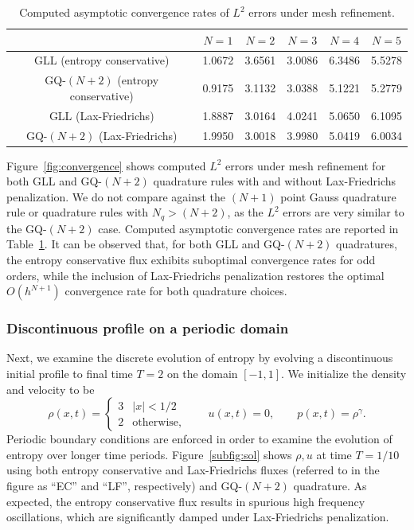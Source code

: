 \documentclass[preprint,10pt]{elsarticle}
\theoremstyle{definition}
\theoremstyle{lemma}
\theoremstyle{theorem}
\theoremstyle{assumption}
\newcommand{\LRb}[1]{\left| #1 \right|}
\begin{document}
\begin{table}[h!]
\centering
 \begin{tabular}{||c | c |c |c |c | c|} 
 \hline
 &  $N=1$ &  $N=2$ &  $N=3$ &  $N=4$ &  $N=5$\\
 \hline
 GLL (entropy conservative) & 1.0672 & 3.6561  &  3.0086 &   6.3486 &   5.5278\\ 
 \hline
 GQ-$(N+2)$ (entropy conservative) &  0.9175  &  3.1132  &  3.0388 &   5.1221 &   5.2779 \\ 
 \hline
 GLL (Lax-Friedrichs) & 1.8887  &  3.0164  &  4.0241 &   5.0650 &   6.1095\\ 
 \hline
 GQ-$(N+2)$ (Lax-Friedrichs) & 1.9950  &  3.0018  &  3.9980  &  5.0419  &  6.0034\\ 
 \hline
 \end{tabular}
 \caption{Computed asymptotic convergence rates of $L^2$ errors under mesh refinement.}
 \label{tab:rates}
\end{table}

Figure~\ref{fig:convergence} shows computed $L^2$ errors under mesh refinement for both GLL and GQ-$(N+2)$ quadrature rules with and without Lax-Friedrichs penalization.  We do not compare against the $(N+1)$ point Gauss quadrature rule or quadrature rules with $N_q > (N+2)$, as the $L^2$ errors are very similar to the GQ-$(N+2)$ case.  Computed asymptotic convergence rates are reported in Table~\ref{tab:rates}.  It can be observed that, for both GLL and GQ-$(N+2)$ quadratures, the entropy conservative flux exhibits suboptimal convergence rates for odd orders, while the inclusion of Lax-Friedrichs penalization restores the optimal $O(h^{N+1})$ convergence rate for both quadrature choices.

\subsubsection{Discontinuous profile on a periodic domain}

Next, we examine the discrete evolution of entropy by evolving a discontinuous initial profile to final time $T=2$ on the domain $[-1,1]$.  We initialize the density and velocity to be 
\begin{equation}
\rho(x,t) = \begin{cases}
3 & \LRb{x} < 1/2\\
2 & \text{otherwise},
\end{cases} \qquad 
u(x,t) = 0, \qquad
p(x,t) = \rho^\gamma.
\label{eq:discontin}
\end{equation}
Periodic boundary conditions are enforced in order to examine the evolution of entropy over longer time periods.  Figure~\ref{subfig:sol} shows $\rho, u$ at time $T = 1/10$ using both entropy conservative and Lax-Friedrichs fluxes (referred to in the figure as ``EC'' and ``LF'', respectively) and GQ-$(N+2)$ quadrature.  As expected, the entropy conservative flux results in spurious high frequency oscillations, which are significantly damped under Lax-Friedrichs penalization.  
\end{document}
